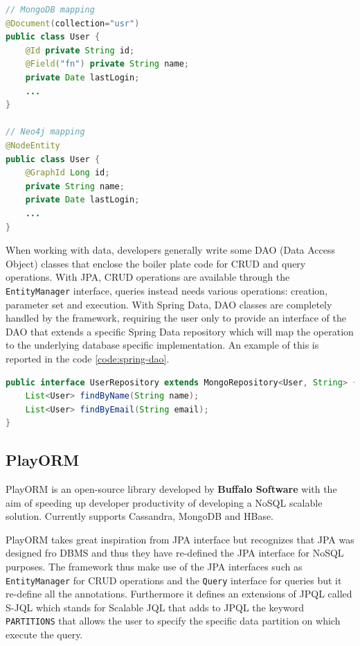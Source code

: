 \begin{lstlisting}[language=Java, caption=Spring Data object mapping, label=code:spring-object-mapping]
// MongoDB mapping
@Document(collection="usr")
public class User {
    @Id private String id;
    @Field("fn") private String name;
    private Date lastLogin;
    ...
}

// Neo4j mapping
@NodeEntity
public class User {
    @GraphId Long id;
    private String name;
    private Date lastLogin;
    ...
}
\end{lstlisting}

\noindent When working with data, developers generally write some DAO (Data Access Object) classes that enclose the boiler plate code for CRUD and query operations.
With JPA, CRUD operations are available through the \texttt{EntityManager} interface, queries instead needs various operations: creation, parameter set and execution.
With Spring Data, DAO classes are completely handled by the framework, requiring the user only to provide an interface of the DAO that extends a specific Spring Data repository which will map the operation to the underlying database specific implementation.
An example of this is reported in the code \ref{code:spring-dao}.

\begin{lstlisting}[language=Java, caption=Spring Data repositories, label=code:spring-dao]
public interface UserRepository extends MongoRepository<User, String> {
    List<User> findByName(String name);
    List<User> findByEmail(String email);
}
\end{lstlisting}

\subsection{PlayORM}
PlayORM \cite{online:playorm} is an open-source library developed by \textbf{Buffalo Software} with the aim of speeding up developer productivity of developing a NoSQL scalable solution. Currently supports Cassandra, MongoDB and HBase. 

\newparagraph PlayORM takes great inspiration from JPA interface but recognizes that JPA was designed fro DBMS and thus they have re-defined the JPA interface  for NoSQL purposes.
The framework thus make use of the JPA interfaces such as \texttt{EntityManager} for CRUD operations and the \texttt{Query} interface for queries but it re-define all the annotations.
Furthermore it defines an extensions of JPQL called S-JQL which stands for Scalable JQL that adds to JPQL the keyword \texttt{PARTITIONS} that allows the user to specify the specific data partition on which execute the query.

